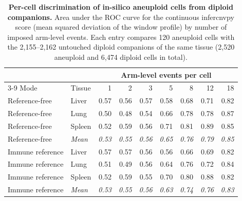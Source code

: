 \begin{table}[htbp]
\centering
\caption{\textbf{Per-cell discrimination of in-silico aneuploid cells from diploid companions.} Area under the ROC curve for the continuous infercnvpy score (mean squared deviation of the window profile) by number of imposed arm-level events. Each entry compares 120 aneuploid cells with the 2,155--2,162 untouched diploid companions of the same tissue (2,520 aneuploid and 6,474 diploid cells in total).}
\label{tab:s2}
\scriptsize
\begin{tabular}{@{}llrrrrrrr@{}}
\toprule
 & & \multicolumn{7}{c}{Arm-level events per cell} \\
\cmidrule(lr){3-9}
Mode & Tissue & 1 & 2 & 3 & 5 & 8 & 12 & 18 \\
\midrule
Reference-free & Liver & 0.57 & 0.56 & 0.57 & 0.58 & 0.68 & 0.71 & 0.82 \\
Reference-free & Lung & 0.50 & 0.48 & 0.54 & 0.66 & 0.78 & 0.78 & 0.87 \\
Reference-free & Spleen & 0.52 & 0.59 & 0.56 & 0.71 & 0.81 & 0.89 & 0.85 \\
Reference-free & \textit{Mean} & \textit{0.53} & \textit{0.55} & \textit{0.56} & \textit{0.65} & \textit{0.76} & \textit{0.79} & \textit{0.85} \\
\midrule
Immune reference & Liver & 0.57 & 0.57 & 0.56 & 0.56 & 0.66 & 0.69 & 0.82 \\
Immune reference & Lung & 0.51 & 0.49 & 0.56 & 0.64 & 0.76 & 0.72 & 0.84 \\
Immune reference & Spleen & 0.52 & 0.59 & 0.55 & 0.70 & 0.80 & 0.88 & 0.82 \\
Immune reference & \textit{Mean} & \textit{0.53} & \textit{0.55} & \textit{0.56} & \textit{0.63} & \textit{0.74} & \textit{0.76} & \textit{0.83} \\
\bottomrule
\end{tabular}
\end{table}
